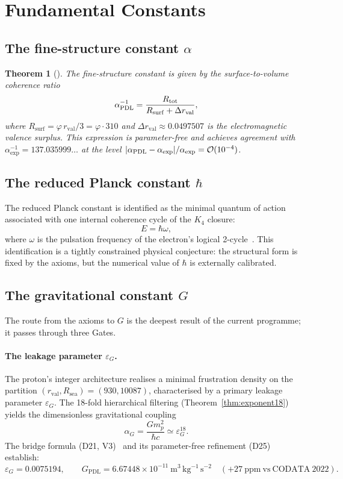 \documentclass[11pt,a4paper]{article}
\theoremstyle{plain}
\newtheorem{theorem}{Theorem}[section]
\theoremstyle{definition}
\theoremstyle{remark}
\newcommand{\PDL}{\textnormal{PDL}}
\newcommand{\Kfour}{K_4}
\newcommand{\GPDL}{G_{\mathrm{PDL}}}
\newcommand{\epsG}{\varepsilon_G}
\newcommand{\rval}{r_{\mathrm{val}}}
\newcommand{\Rsurf}{R_{\mathrm{surf}}}
\newcommand{\Rtot}{R_{\mathrm{tot}}}
\begin{document}
\section{Fundamental Constants}
\label{sec:constants}

\subsection{The fine-structure constant \texorpdfstring{$\alpha$}{alpha}}
\label{subsec:alpha}

\begin{theorem}[\citep{D12,D25}]
\label{thm:alpha}
The fine-structure constant is given by the surface-to-volume coherence ratio
\[
\alpha_{\PDL}^{-1} = \frac{\Rtot}{\Rsurf + \Delta\rval},
\]
where $\Rsurf = \varphi\,\rval/3 = \varphi\cdot 310$ and $\Delta\rval\approx 0.0497507$ is the electromagnetic valence surplus.
This expression is parameter-free and achieves agreement with $\alpha_{\exp}^{-1}=137.035999\ldots$ at the level $|\alpha_{\PDL}-\alpha_{\exp}|/\alpha_{\exp}=\mathcal{O}(10^{-4})$.
\end{theorem}

\subsection{The reduced Planck constant \texorpdfstring{$\hbar$}{hbar}}
\label{subsec:hbar}

The reduced Planck constant is identified as the minimal quantum of action associated with one internal coherence cycle of the $\Kfour$ closure:
\[
E = \hbar\omega,
\]
where $\omega$ is the pulsation frequency of the electron's logical 2-cycle~\citep{D01,D02}.
This identification is a \textcolor{conjecturegreen}{tightly constrained physical conjecture}: the structural form is fixed by the axioms, but the numerical value of $\hbar$ is externally calibrated.

\subsection{The gravitational constant \texorpdfstring{$G$}{G}}
\label{subsec:G}

The route from the axioms to $G$ is the deepest result of the current programme; it passes through three Gates.

\paragraph{The leakage parameter $\epsG$.}
The proton's integer architecture realises a minimal frustration density on the partition $(\rval, R_{\mathrm{sea}}) = (930, 10087)$, characterised by a primary leakage parameter $\epsG$.
The 18-fold hierarchical filtering (Theorem~\ref{thm:exponent18}) yields the dimensionless gravitational coupling
\[
\alpha_G = \frac{G m_p^2}{\hbar c} \simeq \epsG^{18}.
\]
The bridge formula (D21, V3)~\citep{D21} and its parameter-free refinement (D25)~\citep{D25} establish:
\[
\epsG = 0.0075194, \qquad \GPDL = 6.67448\times 10^{-11}~\mathrm{m^3\,kg^{-1}\,s^{-2}} \quad (+27~\mathrm{ppm~vs~CODATA~2022}).
\]
\end{document}
